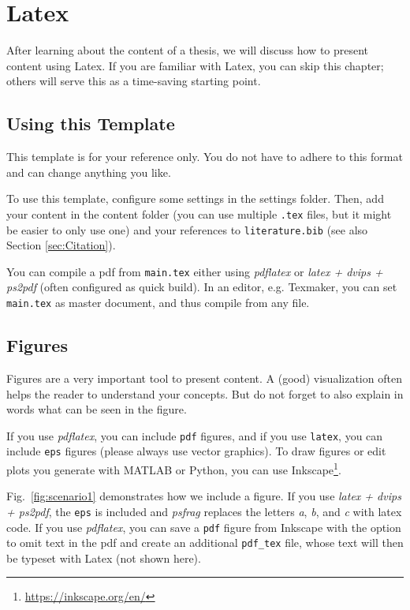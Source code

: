 \chapter{Latex} \label{ch:latex}
After learning about the content of a thesis, we will discuss how to present content using Latex.
If you are familiar with Latex, you can skip this chapter; others will serve this as a time-saving starting point.

\section{Using this Template} \label{sec:Using_this_template}
This template is for your reference only.
You do not have to adhere to this format and can change anything you like.

To use this template, configure some settings in the settings folder.
Then, add your content in the content folder (you can use multiple \texttt{.tex} files, but it might be easier to only use one) and your references
to \texttt{literature.bib} (see also Section \ref{sec:Citation}).

You can compile a pdf from \texttt{main.tex} either using \emph{pdflatex} or \emph{latex + dvips + ps2pdf} (often configured as quick build).
In an editor, e.g. Texmaker, you can set \texttt{main.tex} as master document, and thus compile from any file.

\section{Figures} \label{sec:Figures}
Figures are a very important tool to present content.
A (good) visualization often helps the reader to understand your concepts.
But do not forget to also explain in words what can be seen in the figure.

If you use \emph{pdflatex}, you can include \texttt{pdf} figures, and if you use \texttt{latex}, you can include \texttt{eps} figures (please always
use vector graphics).
To draw figures or edit plots you generate with MATLAB or Python, you can use Inkscape\footnote{\url{https://inkscape.org/en/}}.

Fig.~\ref{fig:scenario1} demonstrates how we include a figure.
If you use \emph{latex + dvips + ps2pdf}, the \texttt{eps} is included and \emph{psfrag} replaces the letters \emph{a}, \emph{b}, and \emph{c} with
latex code.
If you use \emph{pdflatex}, you can save a \texttt{pdf} figure from Inkscape with the option to omit text in the pdf and create an additional
\texttt{pdf\_tex} file, whose text will then be typeset with Latex (not shown here).

